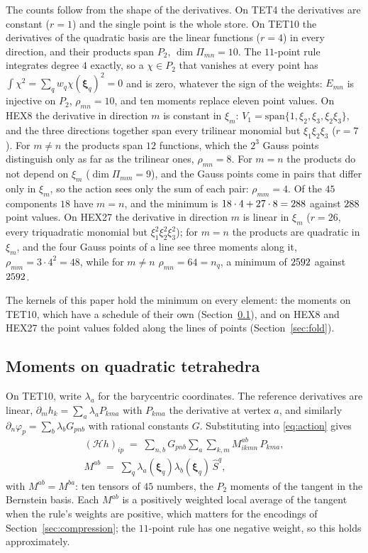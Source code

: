 \documentclass[sigconf,balance=false]{acmart}
\newcommand{\xhat}{\boldsymbol{\xi}}
\newcommand{\Sq}{\widehat{S}^{q}}
\newcommand{\Mab}{M^{ab}}
\begin{document}
The counts follow from the shape of the derivatives.  On TET4 the derivatives are constant
($r=1$) and the single point is the whole store.  On TET10 the derivatives of the quadratic basis
are the linear functions ($r=4$) in every direction, and their products span $P_2$,
$\dim\Pi_{mn}=10$.  The $11$-point rule integrates degree $4$ exactly, so a $\chi\in P_2$ that
vanishes at every point has $\int\chi^2=\sum_q w_q\chi(\xhat_q)^2=0$ and is zero, whatever the sign
of the weights: $E_{mn}$ is injective on $P_2$, $\rho_{mn}=10$, and ten moments replace eleven point
values.  On HEX8 the derivative in direction $m$ is constant in $\xi_m$: $V_1=\mathrm{span}\{1,\xi_2,
\xi_3,\xi_2\xi_3\}$, and the three directions together span every trilinear monomial but
$\xi_1\xi_2\xi_3$ ($r=7$).  For $m\ne n$ the products span $12$ functions, which the $2^3$ Gauss
points distinguish only as far as the trilinear ones, $\rho_{mn}=8$.  For $m=n$ the products do not
depend on $\xi_m$ ($\dim\Pi_{mm}=9$), and the Gauss points come in pairs that differ only in
$\xi_m$, so the action sees only the sum of each pair: $\rho_{mm}=4$.  Of the $45$ components $18$
have $m=n$, and the minimum is $18\cdot4+27\cdot8=288$ against $288$ point
values.  On HEX27 the derivative in direction $m$ is linear in $\xi_m$ ($r=26$, every triquadratic
monomial but $\xi_1^2\xi_2^2\xi_3^2$); for $m=n$ the products are quadratic in $\xi_m$, and the four
Gauss points of a line see three moments along it, $\rho_{mm}=3\cdot4^2=48$, while for $m\ne n$
$\rho_{mn}=64=n_q$, a minimum of $2592$ against $2592$.

The kernels of this paper hold the minimum on every element: the moments on TET10, which have a
schedule of their own (Section~\ref{sec:moments}), and on HEX8 and HEX27 the point values folded
along the lines of points (Section~\ref{sec:fold}).

\subsection{Moments on quadratic tetrahedra}
\label{sec:moments}

On TET10, write $\lambda_a$ for the barycentric coordinates.  The reference
derivatives are linear, $\partial_m h_k = \sum_{a} \lambda_a P_{kma}$ with $P_{kma}$ the derivative
at vertex $a$, and similarly $\partial_n\varphi_p = \sum_b \lambda_b G_{pnb}$ with rational
constants $G$.  Substituting into \eqref{eq:action} gives
\begin{equation}
  \begin{gathered}
  (\mathcal{H} h)_{ip} \;=\; \sum_{n,b} G_{pnb} \sum_{a}\sum_{k,m} \Mab_{ikmn}\, P_{kma} ,\\
  \Mab \;=\; \sum_q \lambda_a(\xhat_q)\lambda_b(\xhat_q)\, \Sq ,
  \end{gathered}
  \label{eq:tet10moments}
\end{equation}
with $\Mab=M^{ba}$: ten tensors of $45$ numbers, the $P_2$ moments of the tangent in the
Bernstein basis.  Each $\Mab$ is a positively weighted local average of the tangent when the rule's
weights are positive, which matters for the encodings of Section~\ref{sec:compression}; the
$11$-point rule has one negative weight, so this holds approximately.
\end{document}
